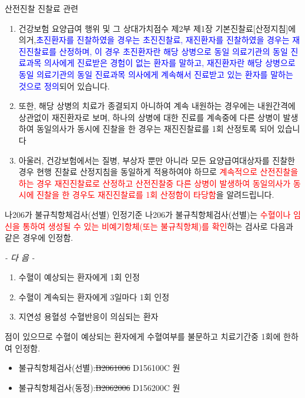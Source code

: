 \par
\medskip
\prezi{\clearpage}
\begin{commentbox}{산전진찰 진찰료 관련} 
\begin{enumerate}[1.]\tightlist
\item 건강보험 요양급여 행위 및 그 상대가치점수 제2부 제1장 기본진찰료[산정지침]에 의거,\textcolor{blue}{초진환자를 진찰하였을 경우는 초진진찰료, 재진환자를 진찰하였을 경우는 재진진찰료를 산정하며, 이 경우 초진환자란 해당 상병으로 동일 의료기관의 동일 진료과목 의사에게 진료받은 경험이 없는 환자를 말하고, 재진환자란 해당 상병으로 동일 의료기관의 동일 진료과목 의사에게 계속해서 진료받고 있는 환자를 말하는 것으로 정의}되어 있습니다.
\item 또한, 해당 상병의 치료가 종결되지 아니하여 계속 내원하는 경우에는 내원간격에 상관없이 재진환자로 보며, 하나의 상병에 대한 진료를 계속중에 다른 상병이 발생하여 동일의사가 동시에 진찰을 한 경우는 재진진찰료를 1회 산정토록 되어 있습니다
\item 아울러, 건강보험에서는 질병, 부상자 뿐만 아니라 모든 요양급여대상자를 진찰한 경우 현행 진찰료 산정지침을 동일하게 적용하여야 하므로 \textcolor{red}{계속적으로 산전진찰을 하는 경우 재진진찰료로 산정하고 산전진찰중 다른 상병이 발생하여 동일의사가 동시에 진찰을 한 경우도 재진진찰료를 1회 산정함이 타당함}을 알려드립니다. 
\end{enumerate}
\end{commentbox}  

\par
\medskip
\prezi{\clearpage}
\prezi{\clearpage}
\begin{commentbox}{나206가 불규칙항체검사(선별) 인정기준}
나206가 불규칙항체검사(선별)는 \textcolor{red}{수혈이나 임신을 통하여 생성될 수 있는 비예기항체(또는 불규칙항체)를 확인}하는 검사로 다음과 같은 경우에 인정함.
\begin{center}\emph{- 다 음 -}\end{center}
\begin{enumerate}[가.]\tightlist
\item 수혈이 예상되는 환자에게 1회 인정
\item 수혈이 계속되는 환자에게 3일마다 1회 인정
\item 지연성 용혈성 수혈반응이 의심되는 환자
\end{enumerate}
점이 있으므로 수혈이 예상되는 환자에게 수혈여부를 불문하고 치료기간중 1회에 한하여 인정함. 

\begin{itemize}\tightlist  
\item 불규칙항체검사(선별):\sout{B2061006} D156100C  원
\item 불규칙항체검사(동정):\sout{B2062006} D156200C  원
\end{itemize}

\end{commentbox}

